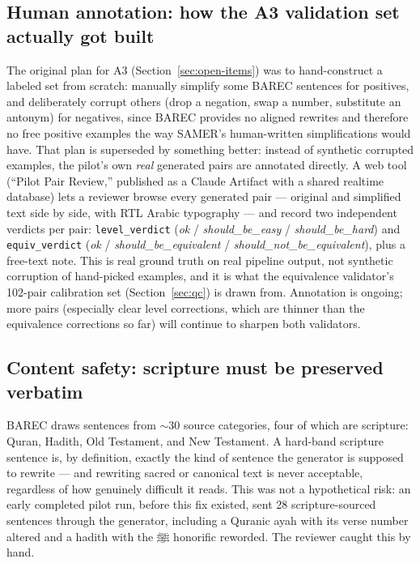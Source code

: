 \documentclass[11pt,a4paper]{article}
\begin{document}
\subsection{Human annotation: how the A3 validation set actually got built}
\label{sec:annotation}

The original plan for A3 (Section~\ref{sec:open-items}) was to hand-construct
a labeled set from scratch: manually simplify some BAREC sentences for
positives, and deliberately corrupt others (drop a negation, swap a number,
substitute an antonym) for negatives, since BAREC provides no aligned
rewrites and therefore no free positive examples the way SAMER's
human-written simplifications would have. That plan is superseded by
something better: instead of synthetic corrupted examples, the pilot's own
\emph{real} generated pairs are annotated directly. A web tool (``Pilot Pair
Review,'' published as a Claude Artifact with a shared realtime database) lets
a reviewer browse every generated pair --- original and simplified text
side by side, with RTL Arabic typography --- and record two independent
verdicts per pair: \texttt{level\_verdict} (\emph{ok} / \emph{should\_be\_easy}
/ \emph{should\_be\_hard}) and \texttt{equiv\_verdict} (\emph{ok} /
\emph{should\_be\_equivalent} / \emph{should\_not\_be\_equivalent}), plus a
free-text note. This is real ground truth on real pipeline output, not
synthetic corruption of hand-picked examples, and it is what the equivalence
validator's 102-pair calibration set (Section~\ref{sec:qc}) is drawn from.
Annotation is ongoing; more pairs (especially clear level corrections, which
are thinner than the equivalence corrections so far) will continue to
sharpen both validators.

\subsection{Content safety: scripture must be preserved verbatim}
\label{sec:scripture}

BAREC draws sentences from $\sim$30 source categories, four of which are
scripture: Quran, Hadith, Old Testament, and New Testament. A hard-band
scripture sentence is, by definition, exactly the kind of sentence the
generator is supposed to rewrite --- and rewriting sacred or canonical text
is never acceptable, regardless of how genuinely difficult it reads. This
was not a hypothetical risk: an early completed pilot run, before this fix
existed, sent 28 scripture-sourced sentences through the generator,
including a Quranic ayah with its verse number altered and a hadith with
the \textarabic{ﷺ} honorific reworded. The reviewer caught this by hand.
\end{document}
